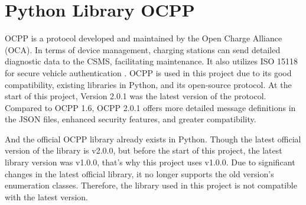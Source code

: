 \documentclass[
	english,
	ruledheaders=section,%
	class=report,%
	thesis={type=Report},%
	accentcolor=9c,%
	custommargins=true,%
	marginpar=false,%
	parskip=half-,%
	fontsize=11pt,%
	logofile={img/tuda_logo.pdf}, %
]{tudapub}
\begin{document}




\section{Python Library OCPP}
\label{sec: ocppLib}



OCPP is a protocol developed and maintained by the Open Charge Alliance (OCA). In terms of device management, charging stations can send detailed diagnostic data to the \ac{CSMS}, facilitating maintenance. It also utilizes ISO 15118 for secure vehicle authentication \cite{OCPP}. \ac{OCPP} is used in this project due to its good compatibility, existing libraries in Python, and its open-source protocol. At the start of this project, Version 2.0.1 was the latest version of the protocol. Compared to \ac{OCPP} 1.6, \ac{OCPP} 2.0.1 offers more detailed message definitions in the JSON files, enhanced security features, and greater compatibility.

 And the official \ac{OCPP} library already exists in Python\cite{ocpplibrary}. Though the latest official version of the library is v2.0.0, but before the start of this project, the latest library version was v1.0.0, that's why this project uses v1.0.0. Due to significant changes in the latest official library, it no longer supports the old version's enumeration classes. Therefore, the library used in this project is not compatible with the latest version.

\end{document}
